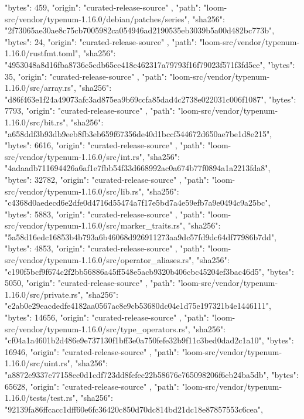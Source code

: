 {{      "bytes": 459,
      "origin": "curated-release-source"
    },
    {
      "path": "loom-src/vendor/typenum-1.16.0/debian/patches/series",
      "sha256": "2f73065ae30ae8c75cb7005982ca054946ad2190535eb3039b5a00d482bc773b",
      "bytes": 24,
      "origin": "curated-release-source"
    },
    {
      "path": "loom-src/vendor/typenum-1.16.0/rustfmt.toml",
      "sha256": "4953048a8d16fba8736c5cdb65ce418e462317a79793f16f79023f571f3fd5ce",
      "bytes": 35,
      "origin": "curated-release-source"
    },
    {
      "path": "loom-src/vendor/typenum-1.16.0/src/array.rs",
      "sha256": "d86f463e1f24a49073afc3ad875ea9b69ccfa85dad4c2738e022031c006f1087",
      "bytes": 7793,
      "origin": "curated-release-source"
    },
    {
      "path": "loom-src/vendor/typenum-1.16.0/src/bit.rs",
      "sha256": "a658ddf3b93db9eeb8fb3eb659f67356de40d1bccf544672d650ae7be1d8e215",
      "bytes": 6616,
      "origin": "curated-release-source"
    },
    {
      "path": "loom-src/vendor/typenum-1.16.0/src/int.rs",
      "sha256": "4adaadb711694426a6af1e7fbb54f33d668992ac0a674b77f0894a1a2213fda8",
      "bytes": 32782,
      "origin": "curated-release-source"
    },
    {
      "path": "loom-src/vendor/typenum-1.16.0/src/lib.rs",
      "sha256": "c4368d0aedecd6e2dfe0d4716d55474a7f17e5bd7a4e59efb7a9e0494c9a25bc",
      "bytes": 5883,
      "origin": "curated-release-source"
    },
    {
      "path": "loom-src/vendor/typenum-1.16.0/src/marker_traits.rs",
      "sha256": "5a58d16edc16853b4b793a6b46068d926911273aa9dc57fd9dc64df77986b7dd",
      "bytes": 4853,
      "origin": "curated-release-source"
    },
    {
      "path": "loom-src/vendor/typenum-1.16.0/src/operator_aliases.rs",
      "sha256": "c190f5bcf9f674c2f2bb56886a45ff548e5acb9320b406cbc45204ef3bac46d5",
      "bytes": 5050,
      "origin": "curated-release-source"
    },
    {
      "path": "loom-src/vendor/typenum-1.16.0/src/private.rs",
      "sha256": "e2ab0e29eacdedfe4182aa0567ac8e9cb53680dc04e1d75e197321b4e1446111",
      "bytes": 14656,
      "origin": "curated-release-source"
    },
    {
      "path": "loom-src/vendor/typenum-1.16.0/src/type_operators.rs",
      "sha256": "cf04a1a4601b2d486e9e737130f1bff3e0a750fefe32b9f11c3bed0dad2c1a10",
      "bytes": 16946,
      "origin": "curated-release-source"
    },
    {
      "path": "loom-src/vendor/typenum-1.16.0/src/uint.rs",
      "sha256": "a8872e9337e77158ec0d1cdf723dd8fefec22b58676e765098206f6cb24ba5db",
      "bytes": 65628,
      "origin": "curated-release-source"
    },
    {
      "path": "loom-src/vendor/typenum-1.16.0/tests/test.rs",
      "sha256": "92139fa86ffcacc1dff60e6fc36420c850d70dc814bd21dc18e87857553c6cea",
}}
